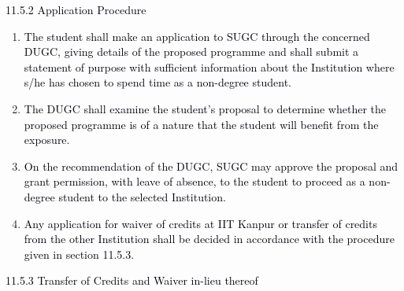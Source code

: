 \documentclass[12pt]{article}
\begin{document}
\vspace{\baselineskip}
{\fontsize{10pt}{12.0pt}\selectfont \textcolor[HTML]{00000A}{11.5.2 Application Procedure}\par}\par


\vspace{\baselineskip}
\begin{enumerate}
	\item {\fontsize{10pt}{12.0pt}\selectfont \textcolor[HTML]{00000A}{The student shall make an application to SUGC through the concerned DUGC, giving details of the proposed programme and shall submit a statement of purpose with sufficient information about the Institution where s/he has chosen to spend time as a non-degree student.}\par}\par


\vspace{\baselineskip}
	\item {\fontsize{10pt}{12.0pt}\selectfont \textcolor[HTML]{00000A}{The DUGC shall examine the student's proposal to determine whether the proposed programme is of a nature that the student will benefit from the exposure.}\par}\par


\vspace{\baselineskip}
	\item {\fontsize{10pt}{12.0pt}\selectfont \textcolor[HTML]{00000A}{On the recommendation of the DUGC, SUGC may approve the proposal and grant permission, with leave of absence, to the student to proceed as a non-degree student to the selected Institution.}\par}\par


\vspace{\baselineskip}
	\item {\fontsize{10pt}{12.0pt}\selectfont \textcolor[HTML]{00000A}{Any application for waiver of credits at IIT Kanpur or transfer of credits from the other Institution shall be decided in accordance with the procedure given in section 11.5.3.}\par}
\end{enumerate}\par


\vspace{\baselineskip}
{\fontsize{10pt}{12.0pt}\selectfont \textcolor[HTML]{00000A}{11.5.3 Transfer of Credits and Waiver in-lieu thereof}\par}\par
\end{document}
